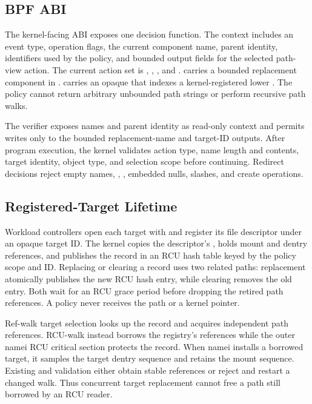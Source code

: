 \subsection{BPF ABI}

The kernel-facing ABI exposes one decision function. The context includes an
event type, operation flags, the current component name, parent identity,
identifiers used by the policy, and bounded output fields for the selected
path-view action. The current action set is , ,
, and .  carries a bounded
replacement component in .  carries an
opaque  that indexes a kernel-registered lower . The policy cannot return arbitrary unbounded path strings or perform
recursive path walks.

The verifier exposes names and parent identity as read-only context and permits
writes only to the bounded replacement-name and target-ID outputs. After
program execution, the kernel validates action type, name length and contents,
target identity, object type, and selection scope before continuing. Redirect
decisions reject empty names, , , embedded nulls, slashes, and
create operations.

\subsection{Registered-Target Lifetime}

Workload controllers open each target with  and register its file
descriptor under an opaque target ID. The kernel copies the descriptor's
, holds mount and dentry references, and publishes the record
in an RCU hash table keyed by the policy scope and ID. Replacing or clearing a
record uses two related paths: replacement atomically publishes the new RCU
hash entry, while clearing removes the old entry. Both wait for an RCU grace
period before dropping the retired path references. A policy never receives
the path or a kernel pointer.

Ref-walk target selection looks up the record and acquires independent path
references. RCU-walk instead borrows the registry's references while the outer
namei RCU critical section protects the record. When namei installs a borrowed
target, it samples the target dentry sequence and retains the mount sequence.
Existing  and  validation either
obtain stable references or reject and restart a changed walk. Thus concurrent
target replacement cannot free a path still borrowed by an RCU reader.

